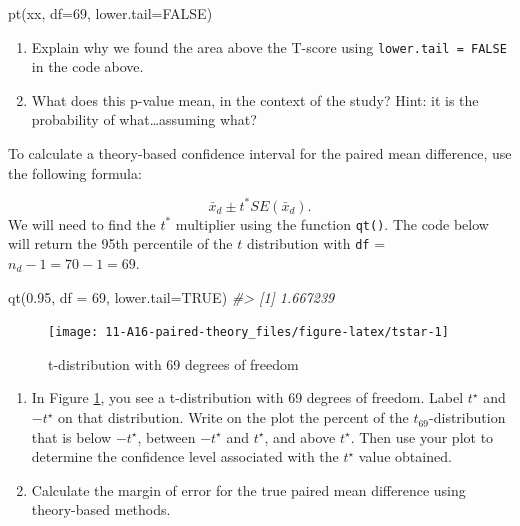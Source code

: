 \documentclass[
]{report}
\newenvironment{Shaded}{\begin{snugshade}}{\end{snugshade}}
\newcommand{\AttributeTok}[1]{\textcolor[rgb]{0.77,0.63,0.00}{#1}}
\newcommand{\CommentTok}[1]{\textcolor[rgb]{0.56,0.35,0.01}{\textit{#1}}}
\newcommand{\ConstantTok}[1]{\textcolor[rgb]{0.00,0.00,0.00}{#1}}
\newcommand{\DecValTok}[1]{\textcolor[rgb]{0.00,0.00,0.81}{#1}}
\newcommand{\FloatTok}[1]{\textcolor[rgb]{0.00,0.00,0.81}{#1}}
\newcommand{\FunctionTok}[1]{\textcolor[rgb]{0.00,0.00,0.00}{#1}}
\newcommand{\NormalTok}[1]{#1}
\begin{document}
\begin{Shaded}
\begin{Highlighting}[]
\FunctionTok{pt}\NormalTok{(xx, }\AttributeTok{df=}\DecValTok{69}\NormalTok{, }\AttributeTok{lower.tail=}\ConstantTok{FALSE}\NormalTok{)}
\end{Highlighting}
\end{Shaded}

\begin{enumerate}
\def\labelenumi{\arabic{enumi}.}
\setcounter{enumi}{8}
\item
  Explain why we found the area above the T-score using \texttt{lower.tail\ =\ FALSE} in the code above.
  \vspace{0.3in}
\item
  What does this p-value mean, in the context of the study? Hint: it is the probability of what\ldots assuming what?
  \vspace{0.8in}
\end{enumerate}

\newpage

To calculate a theory-based confidence interval for the paired mean difference, use the following formula:

\[\bar{x}_d\pm t^* SE(\bar{x}_d).\]
We will need to find the \(t^*\) multiplier using the function \texttt{qt()}. The code below will return the 95th percentile of the \(t\) distribution with \texttt{df} = \(n_d - 1 = 70 - 1 = 69\).

\begin{Shaded}
\begin{Highlighting}[]
\FunctionTok{qt}\NormalTok{(}\FloatTok{0.95}\NormalTok{, }\AttributeTok{df =} \DecValTok{69}\NormalTok{, }\AttributeTok{lower.tail=}\ConstantTok{TRUE}\NormalTok{)}
\CommentTok{\#\textgreater{} [1] 1.667239}
\end{Highlighting}
\end{Shaded}

\begin{figure}

{\centering \texttt{[image: 11-A16-paired-theory\_files/figure-latex/tstar-1]} 

}

\caption{t-distribution with 69 degrees of freedom}\label{fig:tstar}
\end{figure}

\begin{enumerate}
\def\labelenumi{\arabic{enumi}.}
\setcounter{enumi}{10}
\item
  In Figure \ref{fig:tstar}, you see a t-distribution with 69 degrees of freedom. Label \(t^\star\) and \(-t^\star\) on that distribution. Write on the plot the percent of the \(t_{69}\)-distribution that is below \(-t^\star\), between \(-t^\star\) and \(t^\star\), and above \(t^\star\). Then use your plot to determine the confidence level associated with the \(t^\star\) value obtained.
  \vspace{0.3in}
\item
  Calculate the margin of error for the true paired mean difference using theory-based methods.
\end{enumerate}
\end{document}
